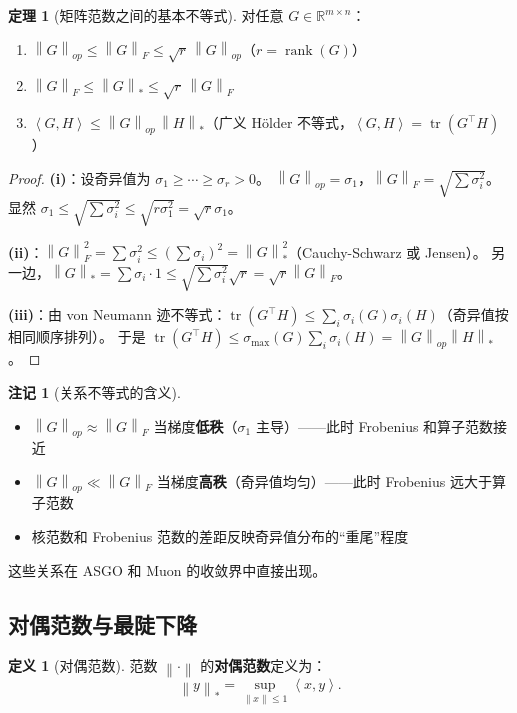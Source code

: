 \documentclass[12pt,a4paper]{ctexart}
\theoremstyle{definition}
\newtheorem{definition}{定义}[section]
\newtheorem{theorem}{定理}[section]
\newtheorem{remark}{注记}[section]
\theoremstyle{plain}
\newcommand{\R}{\mathbb{R}}
\newcommand{\tr}{\operatorname{tr}}
\newcommand{\norm}[1]{\left\lVert #1 \right\rVert}
\newcommand{\ip}[2]{\left\langle #1,#2 \right\rangle}
\DeclareMathOperator{\rank}{rank}
\begin{document}
\begin{theorem}[矩阵范数之间的基本不等式]\label{thm:norm-ineq}
  对任意 $G\in\R^{m\times n}$：
  \begin{enumerate}[label=(\roman*)]
    \item $\norm{G}_{op} \le \norm{G}_F \le \sqrt{r}\,\norm{G}_{op}$（$r=\rank(G)$）
    \item $\norm{G}_F \le \norm{G}_* \le \sqrt{r}\,\norm{G}_F$
    \item $\ip{G}{H} \le \norm{G}_{op}\,\norm{H}_*$（广义 Hölder 不等式，$\ip{G}{H}=\tr(G^\top H)$）
  \end{enumerate}
\end{theorem}

\begin{proof}
  \textbf{(i)}：设奇异值为 $\sigma_1\ge\cdots\ge\sigma_r>0$。
  $\norm{G}_{op}=\sigma_1$，$\norm{G}_F=\sqrt{\sum\sigma_i^2}$。
  显然 $\sigma_1\le\sqrt{\sum\sigma_i^2}\le\sqrt{r\sigma_1^2}=\sqrt{r}\sigma_1$。

  \textbf{(ii)}：$\norm{G}_F^2=\sum\sigma_i^2\le(\sum\sigma_i)^2=\norm{G}_*^2$（Cauchy-Schwarz 或 Jensen）。
  另一边，$\norm{G}_* = \sum\sigma_i\cdot1 \le \sqrt{\sum\sigma_i^2}\sqrt{r} = \sqrt{r}\norm{G}_F$。

  \textbf{(iii)}：由 von Neumann 迹不等式：$\tr(G^\top H)\le\sum_i\sigma_i(G)\sigma_i(H)$（奇异值按相同顺序排列）。
  于是 $\tr(G^\top H)\le\sigma_{\max}(G)\sum_i\sigma_i(H)=\norm{G}_{op}\norm{H}_*$。
\end{proof}

\begin{remark}[关系不等式的含义]
  \begin{itemize}
    \item $\norm{G}_{op}\approx\norm{G}_F$ 当梯度\textbf{低秩}（$\sigma_1$ 主导）——此时 Frobenius 和算子范数接近
    \item $\norm{G}_{op}\ll\norm{G}_F$ 当梯度\textbf{高秩}（奇异值均匀）——此时 Frobenius 远大于算子范数
    \item 核范数和 Frobenius 范数的差距反映奇异值分布的``重尾''程度
  \end{itemize}
  这些关系在 ASGO 和 Muon 的收敛界中直接出现。
\end{remark}

\subsection{对偶范数与最陡下降}

\begin{definition}[对偶范数]
  范数 $\norm{\cdot}$ 的\textbf{对偶范数}定义为：
  \begin{equation}
    \norm{y}_* = \sup_{\norm{x}\le 1} \ip{x}{y}.
  \end{equation}
\end{definition}
\end{document}
